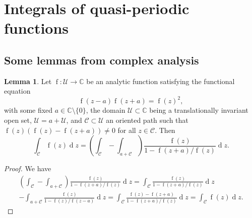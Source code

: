 \documentclass[12pt]{amsart}
\theoremstyle{definition}
\newtheorem{lemma}[theorem]{Lemma}
\begin{document}
\section{Integrals of quasi-periodic functions}
\label{sec.int.quasi}

\subsection{Some lemmas from complex analysis}
\label{sub.two.lemmas}

\begin{lemma}
\label{lem1}
Let $\operatorname{f}\colon \mathcal{U}\to\mathbb{C}$ be an analytic 
function satisfying the functional equation
\begin{equation}
\label{per}
\operatorname{f}(z-a)\operatorname{f}(z+a)=\operatorname{f}(z)^2,
\end{equation}
with some fixed $a\in\mathbb{C}\setminus\{0\}$, the domain 
$\mathcal{U}\subset\mathbb{C}$ being a translationally invariant open set, 
$\mathcal{U}=a+\mathcal{U}$,
and $\mathcal{C}\subset \mathcal{U}$ an oriented path such that 
$\operatorname{f}(z)(\operatorname{f}(z)-\operatorname{f}(z+a))\ne0$ for 
all $z\in \mathcal{C}$. Then
\begin{equation}
\label{residue1}
\int_{\mathcal{C}}\operatorname{f}(z)\operatorname{d}\!z = 
\left(\int_{\mathcal{C}}- \int_{a+\mathcal{C}}\right)
\frac{\operatorname{f}(z)}{1-\operatorname{f}(z+a)/\operatorname{f}(z)}
\operatorname{d}\!z.
\end{equation}
\end{lemma}

\begin{proof}
We have
\begin{multline}
\left(\int_{\mathcal{C}}- \int_{a+\mathcal{C}}\right)
\frac{\operatorname{f}(z)}{1-\operatorname{f}(z+a)/
\operatorname{f}(z)}\operatorname{d}\!z 
=\int_{\mathcal{C}}\frac{\operatorname{f}(z)}{
1-\operatorname{f}(z+a)/\operatorname{f}(z)}\operatorname{d}\!z\\ 
-\int_{a+\mathcal{C}}\frac{\operatorname{f}(z)}{
1-\operatorname{f}(z)/\operatorname{f}(z-a)}\operatorname{d}\!z
=\int_{\mathcal{C}}\frac{\operatorname{f}(z)-\operatorname{f}(z+a)}{
1-\operatorname{f}(z+a)/\operatorname{f}(z)}\operatorname{d}\!z= 
\int_{\mathcal{C}}\operatorname{f}(z)\operatorname{d}\!z .
\end{multline}
\end{proof}
\end{document}
